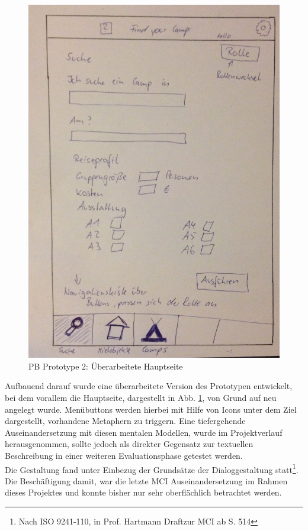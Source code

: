 \begin{figure}
\centering
\includegraphics[width=.5\textwidth]{./images/mainneu.JPG}
\caption{PB Prototype 2: Überarbeitete Hauptseite }
\label{mainneu}
\end{figure}

Aufbauend darauf wurde eine überarbeitete Version des Prototypen entwickelt, bei dem vorallem die Hauptseite, dargestellt in Abb. \ref{mainneu}, von Grund auf neu angelegt wurde. Menübuttons werden hierbei mit Hilfe von Icons unter dem Ziel dargestellt, vorhandene Metaphern zu triggern. Eine tiefergehende Auseinandersetzung mit diesen mentalen Modellen, wurde im Projektverlauf herausgenommen, sollte jedoch als direkter Gegensatz zur textuellen Beschreibung in einer weiteren Evaluationsphase getestet werden. \\

 Die Gestaltung fand unter Einbezug der Grundsätze der Dialoggestaltung statt\footnote{Nach ISO 9241-110, in Prof. Hartmann Draftzur MCI ab S. 514}. Die Beschäftigung damit, war die letzte MCI Auseinandersetzung im Rahmen dieses Projektes und konnte bisher nur sehr oberflächlich betrachtet werden. \\

\newpage

